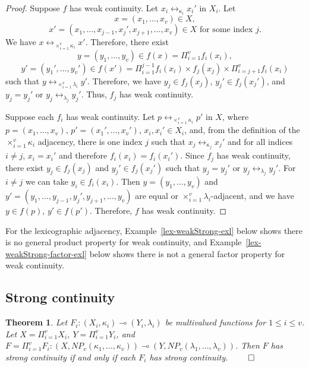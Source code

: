 \documentclass{article}
\theoremstyle{plain}
\newtheorem{thm}{Theorem}
\theoremstyle{definition}
\numberwithin{thm}{section}
\newcommand{\adj}{\leftrightarrow}
\begin{document}
\begin{proof}
Suppose $f$ has weak continuity. Let $x_i \adj_{\kappa_i} x_i'$ in $X_i$.
Let
\[ x=(x_1, \ldots, x_v) \in X,\]
\[x'=(x_1, \ldots, x_{j-1}, x_j', x_{j+1}, \ldots, x_v) \in X \mbox{ for some index } j.\]
We have $x \adj_{\times_{i=1}^v \kappa_i} x'$.
Therefore, there exist
\[y=(y_1,\ldots,y_v) \in f(x) = \Pi_{i=1}^v f_i(x_i),\] 
\[y'=(y_1', \ldots, y_v') \in f(x')=  \Pi_{i=1}^{j-1} f_i(x_i) \times f_j(x_j) \times \Pi_{i=j+1}^v f_i(x_i)\]
such that
$y \adj_{\times_{i=1}^v \lambda_i} y'$. Therefore, we have $y_j \in f_j(x_j)$,
$y_j' \in f_j(x_j')$, and $y_j=y_j'$ or $y_j \adj_{\lambda_j} y_j'$. Thus,
$f_j$ has weak continuity.

Suppose each $f_i$ has weak
continuity. Let
$p \adj_{\times_{i=1}^v \kappa_i} p'$ in $X$, where
$p = (x_1,\ldots,x_v)$,
$p' = (x_1',\ldots,x_v')$,
$x_i, x_i' \in X_i$, and, from
the definition of the $\times_{i=1}^v \kappa_i$ adjacency, there is one index
$j$ such that $x_j \adj_{\kappa_j} x_j'$ and for all indices $i \neq j$, $x_i=x_i'$ and therefore $f_i(x_i)=f_i(x_i')$. Since $f_j$
has weak continuity, there
exist $y_j \in f_j(x_j)$ and
$y_j' \in f_j(x_j')$ such that
$y_j=y_j'$ or $y_j \adj_{\lambda_j} y_j'$. For $i \neq j$ we can take $y_i \in f_i(x_i)$. Then
$y = (y_1,\ldots,y_v)$ and
$y'=(y_1,\ldots,y_{j-1},y_j',y_{j+1},\ldots,y_v)$ are
equal or $\times_{i=1}^v \lambda_i$-adjacent, and we have
$y \in f(p)$, $y' \in f(p')$.
Therefore, $f$ has weak continuity.
\end{proof}

For the lexicographic adjacency,
Example~\ref{lex-weakStrong-exl} below shows there is
no general product property for weak continuity, and
Example~\ref{lex-weakStrong-factor-exl} below shows there is not a general factor property
for weak continuity.

\subsection{Strong continuity}
\begin{thm}
\label{strong-prod}
\rm{\cite{Boxer16a}}
Let $F_i: (X_i, \kappa_i) \multimap (Y_i,\lambda_i)$ be multivalued functions for $1 \le i \le v$.
Let $X = \Pi_{i=1}^v X_i$, $Y = \Pi_{i=1}^v Y_i$, and $F = \Pi_{i=1}^v F_i: (X, NP_v(\kappa_1,\ldots,\kappa_v)) \multimap (Y, NP_v(\lambda_1,\ldots,\lambda_v))$. Then
$F$ has strong continuity if and only if each 
$F_i$ has strong continuity. $\qed$
\end{thm}
\end{document}
